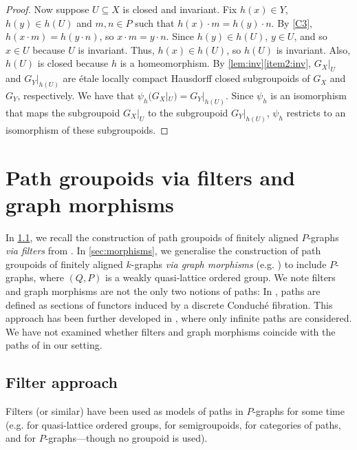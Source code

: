 \documentclass[11pt]{amsart}
\theoremstyle{definition}
\numberwithin{thm}{section}
\numberwithin{equation}{section}
\newcommand{\emphasis}[1]{\textit{#1}}
\newcommand{\RPA}[2]{#1 \cdot #2}
\newcommand{\SDPG}[1]{G_{#1}}
\newcommand{\reduction}[2]{#1|_{#2}}
\begin{document}
\begin{proof}
Now suppose $U \subseteq X$ is closed and invariant.
Fix $h(x) \in Y$, $h(y) \in h(U)$ and $m, n \in P$ such that $\RPA{h(x)}{m} = \RPA{h(y)}{n}$.
By \ref{C3}, $h(\RPA{x}{m}) = h(\RPA{y}{n})$, so $\RPA{x}{m} = \RPA{y}{n}$.
Since $h(y) \in h(U)$, $y \in U$, and so $x \in U$ because $U$ is invariant.
Thus, $h(x) \in h(U)$, so $h(U)$ is invariant.
Also, $h(U)$ is closed because $h$ is a homeomorphism.
By \cref{lem:inv}\eqref{item2:inv}, $\reduction{\SDPG{X}}{U}$ and $\reduction{\SDPG{Y}}{h(U)}$ are \'etale locally compact Hausdorff closed subgroupoids of $\SDPG{X}$ and $\SDPG{Y}$, respectively.
We have that $\psi_h(\reduction{\SDPG{X}}{U}) = \reduction{\SDPG{Y}}{h(U)}$. 
Since $\psi_h$ is an isomorphism that maps the subgroupoid $\reduction{\SDPG{X}}{U}$ to the subgroupoid $\reduction{\SDPG{Y}}{h(U)}$, $\psi_h$ restricts to an isomorphism of these subgroupoids.
\end{proof}

\section{Path groupoids via filters and graph morphisms}
\label{section:graphs}

In \cref{sec:filters}, we recall the construction of path groupoids of finitely aligned $P$-graphs \emphasis{via filters} from \cite{Jon26}.
In \cref{sec:morphisms}, we generalise the construction of path groupoids of finitely aligned $k$-graphs \emphasis{via graph morphisms} (e.g. \cite{Yee07}) to include $P$-graphs, where $(Q, P)$ is a weakly quasi-lattice ordered group.
We note filters and graph morphisms are not the only two notions of paths: In \cite{BY17}, paths are defined as sections of functors induced by a discrete Conduch\'e fibration. 
This approach has been further developed in \cite{Wol23}, where only infinite paths are considered.
We have not examined whether filters and graph morphisms coincide with the paths of \cite{BY17, Wol23} in our setting.

\subsection{Filter approach}
\label{sec:filters}

Filters (or similar) have been used as models of paths in $P$-graphs for some 
time (e.g. \cite{Nic92} for quasi-lattice ordered groups, \cite{Exe08} for 
semigroupoids, \cite{Spi12} for categories of paths, and \cite{BSV13} for 
$P$-graphs---though no groupoid is used).
\end{document}
